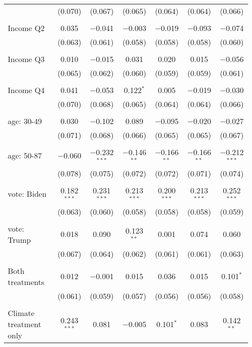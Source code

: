 \begin{tabular}{@{\extracolsep{5pt}}lcccccc}
  & (0.070) & (0.067) & (0.065) & (0.064) & (0.064) & (0.066) \\ 
  & & & & & & \\ 
 Income Q2 & 0.035 & $-$0.041 & $-$0.003 & $-$0.019 & $-$0.093 & $-$0.074 \\ 
  & (0.063) & (0.061) & (0.058) & (0.058) & (0.058) & (0.060) \\ 
  & & & & & & \\ 
 Income Q3 & 0.010 & $-$0.015 & 0.031 & 0.020 & 0.015 & $-$0.056 \\ 
  & (0.065) & (0.062) & (0.060) & (0.059) & (0.059) & (0.061) \\ 
  & & & & & & \\ 
 Income Q4 & 0.041 & $-$0.053 & 0.122$^{*}$ & 0.005 & $-$0.019 & $-$0.030 \\ 
  & (0.070) & (0.068) & (0.065) & (0.064) & (0.064) & (0.066) \\ 
  & & & & & & \\ 
 age: 30-49 & 0.030 & $-$0.102 & 0.089 & $-$0.095 & $-$0.020 & $-$0.027 \\ 
  & (0.071) & (0.068) & (0.066) & (0.065) & (0.065) & (0.067) \\ 
  & & & & & & \\ 
 age: 50-87 & $-$0.060 & $-$0.232$^{***}$ & $-$0.146$^{**}$ & $-$0.166$^{**}$ & $-$0.166$^{**}$ & $-$0.212$^{***}$ \\ 
  & (0.078) & (0.075) & (0.072) & (0.072) & (0.071) & (0.074) \\ 
  & & & & & & \\ 
 vote: Biden & 0.182$^{***}$ & 0.231$^{***}$ & 0.213$^{***}$ & 0.200$^{***}$ & 0.213$^{***}$ & 0.252$^{***}$ \\ 
  & (0.063) & (0.060) & (0.058) & (0.058) & (0.058) & (0.059) \\ 
  & & & & & & \\ 
 vote: Trump & 0.018 & 0.090 & 0.123$^{**}$ & 0.001 & 0.074 & 0.060 \\ 
  & (0.067) & (0.064) & (0.062) & (0.061) & (0.061) & (0.063) \\ 
  & & & & & & \\ 
 Both treatments & 0.012 & $-$0.001 & 0.015 & 0.036 & 0.015 & 0.101$^{*}$ \\ 
  & (0.061) & (0.059) & (0.057) & (0.056) & (0.056) & (0.058) \\ 
  & & & & & & \\ 
 Climate treatment only & 0.243$^{***}$ & 0.081 & $-$0.005 & 0.101$^{*}$ & 0.083 & 0.142$^{**}$ \\ 

\end{tabular}
